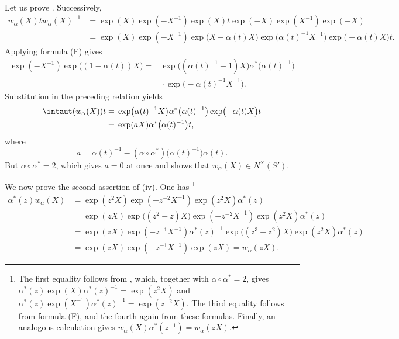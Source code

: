 Let us prove \textup{}. Successively,
\[
\begin{aligned}
  w_\alpha(X)t w_\alpha(X)^{-1}
    &={}\exp(X)\exp(-X^{-1})\exp(X)t
       \exp(-X)\exp(X^{-1})\exp(-X)\\
    &={}\exp(X)\exp(-X^{-1})
       \exp\bigl(X-\alpha(t)X\bigr)
       \exp\bigl(\alpha(t)^{-1}X^{-1}\bigr)
       \exp\bigl(-\alpha(t)X\bigr)t.
\end{aligned}
\]
Applying formula \textup{(F)} gives
\[
\begin{aligned}
  \exp(-X^{-1})\exp\bigl((1-\alpha(t))X\bigr)
    ={}&\exp\bigl((\alpha(t)^{-1}-1)X\bigr)
       \alpha^\ast\bigl(\alpha(t)^{-1}\bigr)\\
     &{}\cdot\exp\bigl(-\alpha(t)^{-1}X^{-1}\bigr).
\end{aligned}
\]
Substitution in the preceding relation yields
\[
\begin{aligned}
  \intaut(w_\alpha(X))t
    &={}\exp\bigl(\alpha(t)^{-1}X\bigr)
       \alpha^\ast\bigl(\alpha(t)^{-1}\bigr)
       \exp\bigl(-\alpha(t)X\bigr)t\\
    &={}\exp(aX)\alpha^\ast\bigl(\alpha(t)^{-1}\bigr)t,
\end{aligned}
\]
where
\[
  a=\alpha(t)^{-1}
     -(\alpha\circ\alpha^\ast)\bigl(\alpha(t)^{-1}\bigr)\alpha(t).
\]
But \(\alpha\circ\alpha^\ast=2\), which gives \(a=0\) at once and
shows that \(w_\alpha(X)\in N^\times(S')\).

We now prove the second assertion of \textup{(iv)}. One has%
\footnote{The first equality follows from  \textup{}, which,
together with \(\alpha\circ\alpha^\ast=2\), gives
\(\alpha^\ast(z)\exp(X)\alpha^\ast(z)^{-1}=\exp(z^2X)\) and
\(\alpha^\ast(z)\exp(X^{-1})\alpha^\ast(z)^{-1}
=\exp(z^{-2}X)\). The third equality follows from formula
\textup{(F)}, and the fourth again from these formulas. Finally, an
analogous calculation gives
\(w_\alpha(X)\alpha^\ast(z^{-1})=w_\alpha(zX)\).}
\[
\begin{aligned}
  \alpha^\ast(z)w_\alpha(X)
    &={}\exp(z^2X)\exp(-z^{-2}X^{-1})
       \exp(z^2X)\alpha^\ast(z)\\
    &={}\exp(zX)\exp\bigl((z^2-z)X\bigr)
       \exp(-z^{-2}X^{-1})\exp(z^2X)\alpha^\ast(z)\\
    &={}\exp(zX)\exp(-z^{-1}X^{-1})\alpha^\ast(z)^{-1}
       \exp\bigl((z^3-z^2)X\bigr)\exp(z^2X)\alpha^\ast(z)\\
    &={}\exp(zX)\exp(-z^{-1}X^{-1})\exp(zX)
       =w_\alpha(zX).
\end{aligned}
\]


